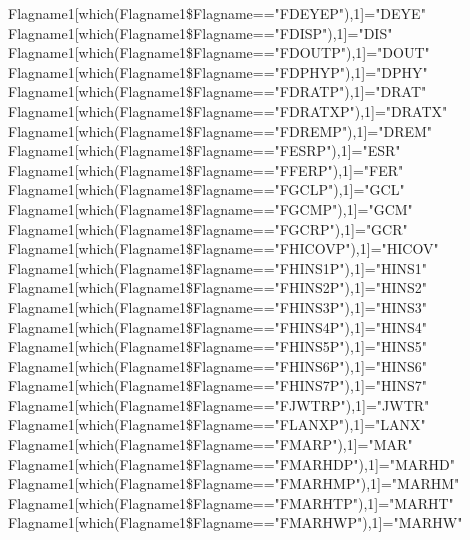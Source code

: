 \documentclass[12pt]{article}
\begin{document}
Flagname1[which(Flagname1\$Flagname=="FDEYEP"),1]="DEYE"\\
Flagname1[which(Flagname1\$Flagname=="FDISP"),1]="DIS"\\
Flagname1[which(Flagname1\$Flagname=="FDOUTP"),1]="DOUT"\\
Flagname1[which(Flagname1\$Flagname=="FDPHYP"),1]="DPHY"\\
Flagname1[which(Flagname1\$Flagname=="FDRATP"),1]="DRAT"\\
Flagname1[which(Flagname1\$Flagname=="FDRATXP"),1]="DRATX"\\
Flagname1[which(Flagname1\$Flagname=="FDREMP"),1]="DREM"\\
Flagname1[which(Flagname1\$Flagname=="FESRP"),1]="ESR"\\
Flagname1[which(Flagname1\$Flagname=="FFERP"),1]="FER"\\
Flagname1[which(Flagname1\$Flagname=="FGCLP"),1]="GCL"\\
Flagname1[which(Flagname1\$Flagname=="FGCMP"),1]="GCM"\\
Flagname1[which(Flagname1\$Flagname=="FGCRP"),1]="GCR"\\
Flagname1[which(Flagname1\$Flagname=="FHICOVP"),1]="HICOV"\\
Flagname1[which(Flagname1\$Flagname=="FHINS1P"),1]="HINS1"\\
Flagname1[which(Flagname1\$Flagname=="FHINS2P"),1]="HINS2"\\
Flagname1[which(Flagname1\$Flagname=="FHINS3P"),1]="HINS3"\\
Flagname1[which(Flagname1\$Flagname=="FHINS4P"),1]="HINS4"\\
Flagname1[which(Flagname1\$Flagname=="FHINS5P"),1]="HINS5"\\
Flagname1[which(Flagname1\$Flagname=="FHINS6P"),1]="HINS6"\\
Flagname1[which(Flagname1\$Flagname=="FHINS7P"),1]="HINS7"\\
Flagname1[which(Flagname1\$Flagname=="FJWTRP"),1]="JWTR"\\
Flagname1[which(Flagname1\$Flagname=="FLANXP"),1]="LANX"\\
Flagname1[which(Flagname1\$Flagname=="FMARP"),1]="MAR"\\
Flagname1[which(Flagname1\$Flagname=="FMARHDP"),1]="MARHD"\\
Flagname1[which(Flagname1\$Flagname=="FMARHMP"),1]="MARHM"\\
Flagname1[which(Flagname1\$Flagname=="FMARHTP"),1]="MARHT"\\
Flagname1[which(Flagname1\$Flagname=="FMARHWP"),1]="MARHW"\\
\end{document}
